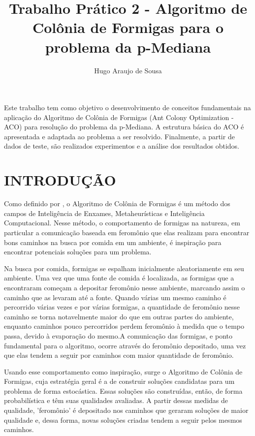 \documentclass[12pt]{article}
\title{Trabalho Prático 2 - Algoritmo de Colônia de Formigas para o problema da p-Mediana}
\author{Hugo Araujo de Sousa}
\begin{document}
 

\maketitle
     
\begin{resumo}
  Este trabalho tem como objetivo o desenvolvimento de conceitos fundamentais na
  aplicação do Algoritmo de Colônia de Formigas (Ant Colony Optimization - ACO)
  para resolução do problema da p-Mediana. A estrutura básica do ACO é apresentada
  e adaptada ao problema a ser resolvido. Finalmente, a partir de dados de teste,
  são realizados experimentos e a análise dos resultados obtidos.
\end{resumo}

\section{INTRODUÇÃO}

Como definido por \cite{clalg:11}, o Algoritmo de Colônia de Formigas é um método
dos campos de Inteligência de Enxames, Metaheurísticas e Inteligência Computacional.
Nesse método, o comportamento de formigas na natureza, em particular a comunicação
baseada em feromônio que elas realizam para encontrar bons caminhos na busca por comida
em um ambiente, é inspiração para encontrar potenciais soluções para um problema.

Na busca por comida, formigas se espalham inicialmente aleatoriamente em seu ambiente.
Uma vez que uma fonte de comida é localizada, as formigas que a encontraram começam a
depositar feromônio nesse ambiente, marcando assim o caminho que as levaram até a fonte.
Quando várias um mesmo caminho é percorrido várias vezes e por várias formigas, a quantidade
de feromônio nesse caminho se torna notavelmente maior do que em outras partes do ambiente,
enquanto caminhos pouco percorridos perdem feromônio à medida que o tempo passa, devido à
evaporação do mesmo.A comunicação das formigas, e ponto fundamental para o algoritmo,
ocorre através do feromônio depositado, uma vez que elas tendem a seguir por caminhos com
maior quantidade de feromônio.

Usando esse comportamento como inspiração, surge o Algoritmo de Colônia de Formigas, cuja 
estratégia geral é a de construir soluções candidatas para um problema de forma estocástica.
Essas soluções são construídas, então, de forma probabilística e têm suas qualidades avaliadas.
A partir dessas medidas de qualidade, 'feromônio' é depositado nos caminhos que geraram soluções
de maior qualidade e, dessa forma, novas soluções criadas tendem a seguir pelos mesmos caminhos.
\end{document}
